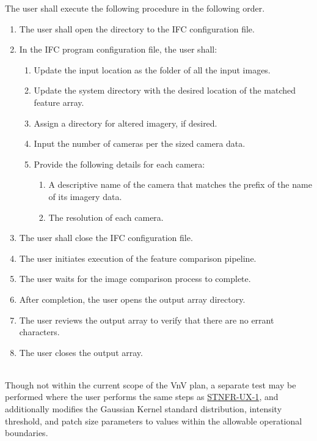 \documentclass[12pt, titlepage]{article}
\begin{document}
The user shall execute the following procedure in the following order.
\begin{enumerate}
  \item The user shall open the directory to the IFC configuration file.
  \item In the IFC program configuration file, the user shall:
  \begin{enumerate}
      \item Update the input location as the folder of all the input images.
      \item Update the system directory with the desired location of the matched feature array.
      \item Assign a directory for altered imagery, if desired.
      \item Input the number of cameras per the sized camera data.
      \item Provide the following details for each camera:
      \begin{enumerate}
          \item A descriptive name of the camera that matches the prefix of the name of its imagery data.
          \item The resolution of each camera.
      \end{enumerate}
  \end{enumerate}
  \item The user shall close the IFC configuration file.
  \item The user initiates execution of the feature comparison pipeline.
  \item The user waits for the image comparison process to complete.
  \item After completion, the user opens the output array directory.
  \item The user reviews the output array to verify that there are no errant characters.
  \item The user closes the output array.
\end{enumerate}
\mbox{} \\
Though not within the current scope of the VnV plan, a separate test may be performed where the 
user performs the same steps as \hyperlink{STNFR-UX-1}{STNFR-UX-1}, 
and additionally modifies the Gaussian Kernel standard distribution, intensity threshold, and patch size 
parameters to values within the allowable operational boundaries. 
\end{document}
